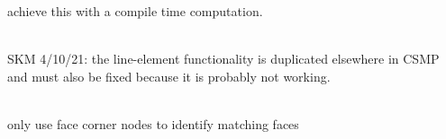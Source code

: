 \begin{DoxyRefList}
\label{todo__todo000147}%
%
achieve this with a compile time computation. 
\item[Member \doxylink{classcsmp_1_1_v_data_a32818b04bd9be0b469ea0459424fbf52}{csmp\+::VData\+::Establish\+Element\+Connectivity2D} ()]\hfill \\
\label{todo__todo000081}%
%
SKM 4/10/21\+: the line-\/element functionality is duplicated elsewhere in CSMP and must also be fixed because it is probably not working. 
\item[Member \doxylink{classcsmp_1_1_v_data_a0b188c1c5071424637d016df39f4409e}{csmp\+::VData\+::Establish\+Element\+Connectivity3D} ()]\hfill \\
\label{todo__todo000082}%
%
only use face corner nodes to identify matching faces 




\end{DoxyRefList}
